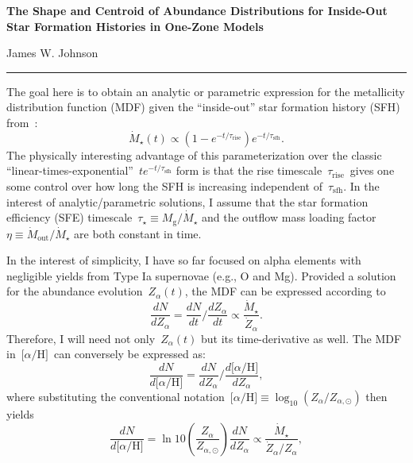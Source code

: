 \documentclass[12pt]{article}
\newcommand{\ah}{\ensuremath{\text{[$\alpha$/H]}}}
\newcommand{\timescale}[1]{\ensuremath{\tau_\text{#1}}}
\begin{document}
\begin{center}
\textbf{The Shape and Centroid of Abundance Distributions for Inside-Out Star
Formation Histories in One-Zone Models}
\par\null\par
James W. Johnson
\par\null\par
\rule[0.7\baselineskip]{0.5\textwidth}{0.4pt}
\end{center}

\par\noindent
The goal here is to obtain an analytic or parametric expression for the
metallicity distribution function (MDF) given the ``inside-out'' star formation
history (SFH) from~\citet{Johnson2021}:
\begin{equation}
\dot{M}_\star(t) \propto (1 - e^{-t / \timescale{rise}})
e^{-t / \timescale{sfh}}.
\label{eq:insideout_sfh}
\end{equation}
The physically interesting advantage of this parameterization over the classic
``linear-times-exponential''~$t e^{-t / \timescale{sfh}}$ form is that the
rise timescale~\timescale{rise}~gives one some control over how long the SFH is
increasing independent of~\timescale{sfh}.
In the interest of analytic/parametric solutions, I assume that the star
formation efficiency (SFE) timescale~$\tau_\star \equiv M_\text{g} /
\dot{M}_\star$ and the outflow mass loading factor~$\eta \equiv
\dot{M}_\text{out} / \dot{M}_\star$ are both constant in time.
\par
In the interest of simplicity, I have so far focused on alpha elements with
negligible yields from Type Ia supernovae (e.g., O and Mg).
Provided a solution for the abundance evolution~$Z_\alpha(t)$, the MDF can be
expressed according to
\begin{equation}
\frac{dN}{dZ_\alpha} = \frac{dN}{dt} \bigg/ \frac{dZ_\alpha}{dt}
\propto \frac{\dot{M}_\star}{\dot{Z}_\alpha}.
\label{eq:dndz}
\end{equation}
Therefore, I will need not only~$Z_\alpha(t)$ but its time-derivative as well.
The MDF in~\ah~can conversely be expressed as:
\begin{equation}
\frac{dN}{d\ah} = \frac{dN}{dZ_\alpha} \bigg/ \frac{d\ah}{dZ_\alpha},
\end{equation}
where substituting the conventional notation~$\ah \equiv \log_{10}(Z_\alpha /
Z_{\alpha,\odot})$ then yields
\begin{equation}
\frac{dN}{d\ah} = \ln 10 \left(\frac{Z_\alpha}{Z_{\alpha,\odot}}\right)
\frac{dN}{dZ_\alpha}
\propto \frac{\dot{M}_\star}{\dot{Z}_\alpha / Z_\alpha},
\label{eq:dndlogz}
\end{equation}
\end{document}
